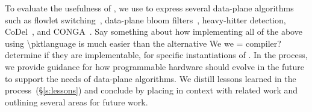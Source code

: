To evaluate the usefulness of \pktlanguage, we use \pktlanguage
to express several data-plane algorithms such as flowlet
switching~\cite{flowlet}, data-plane bloom filters~\cite{bloom}, heavy-hitter
detection, CoDel~\cite{codel}, and CONGA~\cite{conga}. 
\ac{Say something about how implementing all of the above using \pktlanguage
is much easier than the alternative} We \ac{we = compiler?} determine if they are
implementable, for specific instantiations of \absmachine. In the process, we
provide guidance for how programmable hardware should evolve in the future to
support the needs of data-plane algorithms.  We distill lessons learned in the
process~(\S\ref{s:lessons}) and conclude by placing \pktlanguage in context
with related work and outlining several areas for future work.

